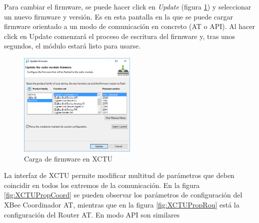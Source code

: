 Para cambiar el firmware, se puede hacer click en \textit{Update} (figura \ref{fig:firmXCTU}) y seleccionar un nuevo firmware y versión. Es en esta pantalla en la que se puede cargar firmware orientado a un modo de comunicación en concreto (AT o API). Al hacer click en Update comenzará el proceso de escritura del firmware y, tras unos segundos, el módulo estará listo para usarse. 

\begin{figure}[h]
\centering
\includegraphics[width=0.5\textwidth]{figuras/firmXCTU.png}
\caption{Carga de firmware en XCTU}
\label{fig:firmXCTU}
\end{figure}

La interfaz de XCTU permite modificar multitud de parámetros que deben coincidir en todos los extremos de la comunicación. En la figura \ref{fig:XCTUPropCoord} se pueden observar los parámetros de configuración del XBee Coordinador AT, mientras que en la figura \ref{fig:XCTUPropRou} está la configuración del Router AT. En modo API son similares

